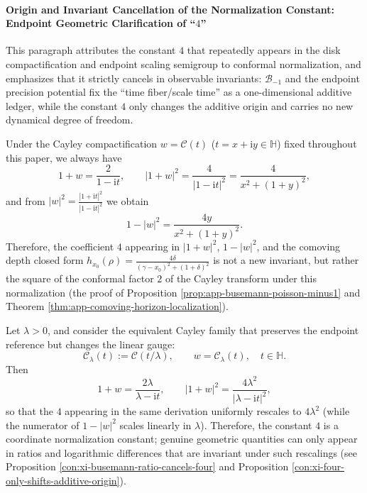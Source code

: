 \paragraph{Origin and Invariant Cancellation of the Normalization Constant: Endpoint Geometric Clarification of ``\texorpdfstring{$4$}{4}''}
This paragraph attributes the constant \(4\) that repeatedly appears in the disk compactification and endpoint scaling semigroup to conformal normalization, and emphasizes that it strictly cancels in observable invariants: \(\mathcal{B}_{-1}\) and the endpoint precision potential fix the ``time fiber/scale time'' as a one-dimensional additive ledger, while the constant \(4\) only changes the additive origin and carries no new dynamical degree of freedom.

\begin{proposition}\label{con:xi-four-from-cayley-conformal-factor}
Under the Cayley compactification \(w=\mathcal{C}(t)\) (\(t=x+\mathrm{i}y\in\mathbb{H}\)) fixed throughout this paper, we always have
\[
1+w=\frac{2}{1-\mathrm{i}t},
\qquad
|1+w|^{2}=\frac{4}{|1-\mathrm{i}t|^{2}}=\frac{4}{x^{2}+(1+y)^{2}},
\]
and from
\(
|w|^{2}=\frac{|1+\mathrm{i}t|^{2}}{|1-\mathrm{i}t|^{2}}
\)
we obtain
\[
1-|w|^{2}
=\frac{4y}{x^{2}+(1+y)^{2}}.
\]
Therefore, the coefficient \(4\) appearing in \(|1+w|^{2}\), \(1-|w|^{2}\), and the comoving depth closed form
\(
h_{x_{0}}(\rho)=\frac{4\delta}{(\gamma-x_{0})^{2}+(1+\delta)^{2}}
\)
is not a new invariant, but rather the square of the conformal factor \(2\) of the Cayley transform under this normalization (the proof of Proposition \ref{prop:app-busemann-poisson-minus1} and Theorem \ref{thm:app-comoving-horizon-localization}).
\end{proposition}

\begin{proposition}\label{con:xi-four-rescales-under-cayley-gauge}
Let \(\lambda>0\), and consider the equivalent Cayley family that preserves the endpoint reference but changes the linear gauge:
\[
\mathcal{C}_{\lambda}(t):=\mathcal{C}(t/\lambda),
\qquad
w=\mathcal{C}_{\lambda}(t),\quad t\in\mathbb{H}.
\]
Then
\[
1+w=\frac{2\lambda}{\lambda-\mathrm{i}t},
\qquad
|1+w|^{2}=\frac{4\lambda^{2}}{|\lambda-\mathrm{i}t|^{2}},
\]
so that the \(4\) appearing in the same derivation uniformly rescales to \(4\lambda^{2}\) (while the numerator of \(1-|w|^{2}\) scales linearly in \(\lambda\)).
Therefore, the constant \(4\) is a coordinate normalization constant; genuine geometric quantities can only appear in ratios and logarithmic differences that are invariant under such rescalings (see Proposition \ref{con:xi-busemann-ratio-cancels-four} and Proposition \ref{con:xi-four-only-shifts-additive-origin}).
\end{proposition}

